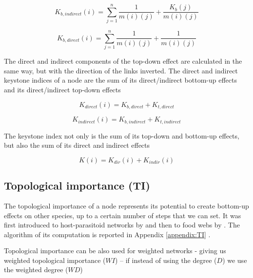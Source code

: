 \documentclass[twocolumn]{article}
\begin{document}
					\begin{equation}
						K_{b,indirect}\left(i\right)=\sum_{j=1}^{n}\frac{1}{m\left(i\right)\left(j\right)}+\frac{K_b\left(j\right)}{m\left(i\right)\left(j\right)}
					\end{equation}

					\begin{equation}
						K_{b,direct}\left(i\right)=\sum_{j=1}^{n}\frac{1}{m\left(i\right)\left(j\right)}+\frac{1}{m\left(i\right)\left(j\right)}
					\end{equation}

		The direct and indirect components of the top-down effect are calculated in the same way, but with the direction of the links inverted. The direct and indirect keystone indices of a node are the sum of its direct/indirect bottom-up effects and its direct/indirect top-down effects

					\begin{equation}
						K_{direct}(i)=K_{b,direct}+K_{t,direct}
					\end{equation}

					\begin{equation}
						K_{indirect}(i)=K_{b,indirect}+K_{t,indirect}
					\end{equation}

		The keystone index not only is the sum of its top-down and bottom-up effects, but also the sum of its direct and indirect effects

					\begin{equation}
						K\left(i\right)=K_{dir}\left(i\right)+K_{indir}\left(i\right)
					\end{equation}

	\subsection*{Topological importance (TI)}

		The topological importance of a node represents its potential to create bottom-up effects on other species, up to a certain number of steps that we can set. It was first introduced to host-parasitoid networks by \citet{Muller1999} and then to food webs by \citet{Jordan2003}. The algorithm of its computation is reported in Appendix \ref{appendix:TI} \citep{Jordan2009}.



		Topological importance can be also used for weighted networks - giving us weighted topological importance ($WI$) – if instead of using the degree ($D$) we use the weighted degree ($WD$) \citep{Scotti2007}
\end{document}
